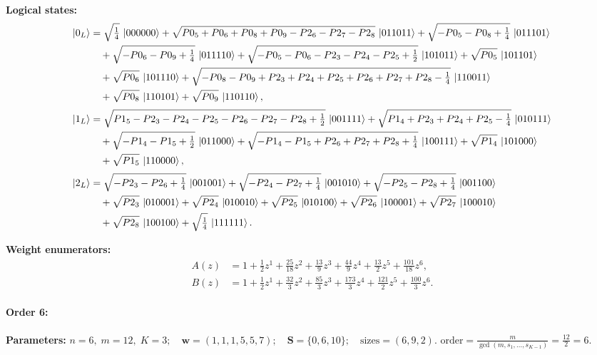 \documentclass[11pt]{article}
\begin{document}
\noindent\textbf{Logical states:}
\begin{align*}
\ket{0_L} &= \sqrt{\tfrac{1}{4}}\,\ket{000000} + \sqrt{P0_5 + P0_6 + P0_8 + P0_9 - P2_6 - P2_7 - P2_8}\,\ket{011011} + \sqrt{-P0_5 - P0_8 + \tfrac{1}{4}}\,\ket{011101}\\
&\quad + \sqrt{-P0_6 - P0_9 + \tfrac{1}{4}}\,\ket{011110} + \sqrt{-P0_5 - P0_6 - P2_3 - P2_4 - P2_5 + \tfrac{1}{2}}\,\ket{101011} + \sqrt{P0_5}\,\ket{101101}\\
&\quad + \sqrt{P0_6}\,\ket{101110} + \sqrt{-P0_8 - P0_9 + P2_3 + P2_4 + P2_5 + P2_6 + P2_7 + P2_8 - \tfrac{1}{4}}\,\ket{110011}\\
&\quad + \sqrt{P0_8}\,\ket{110101} + \sqrt{P0_9}\,\ket{110110},
\\[2pt]
\ket{1_L} &= \sqrt{P1_5 - P2_3 - P2_4 - P2_5 - P2_6 - P2_7 - P2_8 + \tfrac{1}{2}}\,\ket{001111} + \sqrt{P1_4 + P2_3 + P2_4 + P2_5 - \tfrac{1}{4}}\,\ket{010111}\\
&\quad + \sqrt{-P1_4 - P1_5 + \tfrac{1}{2}}\,\ket{011000} + \sqrt{-P1_4 - P1_5 + P2_6 + P2_7 + P2_8 + \tfrac{1}{4}}\,\ket{100111} + \sqrt{P1_4}\,\ket{101000}\\
&\quad + \sqrt{P1_5}\,\ket{110000},
\\[2pt]
\ket{2_L} &= \sqrt{-P2_3 - P2_6 + \tfrac{1}{4}}\,\ket{001001} + \sqrt{-P2_4 - P2_7 + \tfrac{1}{4}}\,\ket{001010} + \sqrt{-P2_5 - P2_8 + \tfrac{1}{4}}\,\ket{001100}\\
&\quad + \sqrt{P2_3}\,\ket{010001} + \sqrt{P2_4}\,\ket{010010} + \sqrt{P2_5}\,\ket{010100} + \sqrt{P2_6}\,\ket{100001} + \sqrt{P2_7}\,\ket{100010}\\
&\quad + \sqrt{P2_8}\,\ket{100100} + \sqrt{\tfrac{1}{4}}\,\ket{111111}.
\end{align*}

\noindent\textbf{Weight enumerators:}
\begin{align*}
A(z) &= 1 + \tfrac{1}{2}z^{1} + \tfrac{25}{18}z^{2} + \tfrac{13}{9}z^{3} + \tfrac{44}{9}z^{4} + \tfrac{13}{2}z^{5} + \tfrac{101}{18}z^{6},\\[2pt]
B(z) &= 1 + \tfrac{1}{2}z^{1} + \tfrac{32}{3}z^{2} + \tfrac{85}{3}z^{3} + \tfrac{173}{3}z^{4} + \tfrac{121}{2}z^{5} + \tfrac{100}{3}z^{6}.
\end{align*}

\paragraph{\textbf{Order 6:}}
\noindent\textbf{Parameters:} $n=6,\; m=12,\; K=3;\quad \mathbf w=(1, 1, 1, 5, 5, 7);\quad \mathbf S=\{0, 6, 10\};\quad \text{sizes}=\left(6, 9, 2\right).$ $\displaystyle \text{order}=\frac{m}{\gcd(m,s_1,\dots,s_{K-1})}=\frac{12}{2}=6.$
\end{document}
